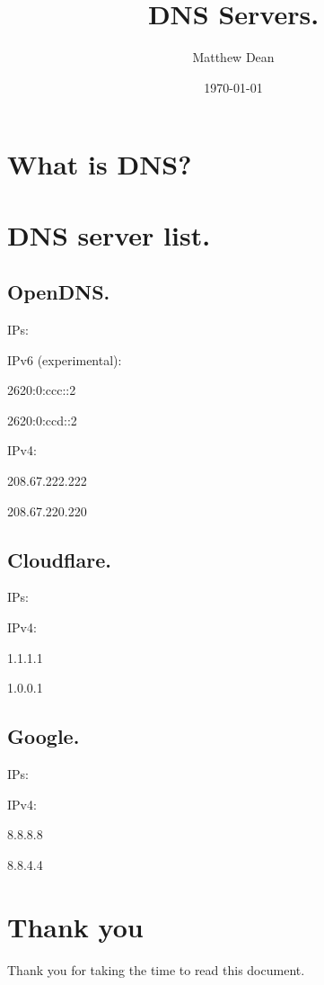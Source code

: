 \documentclass[a4paper, 12pt]{article}
\begin{document}
\title{DNS Servers.}
\author{Matthew Dean}
\date{\today}
\maketitle

\section{What is DNS?}

\section{DNS server list.}

\subsection{OpenDNS.}

IPs:

IPv6 (experimental):

2620:0:ccc::2

2620:0:ccd::2

IPv4:

208.67.222.222

208.67.220.220

\subsection{Cloudflare.}

IPs:

IPv4:

1.1.1.1

1.0.0.1

\subsection{Google.}

IPs:

IPv4:

8.8.8.8

8.8.4.4

\section{Thank you}

Thank you for taking the time to read this document.
\end{document}
